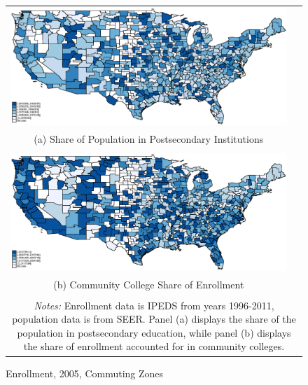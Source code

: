 \begin{figure}[h]\centering\caption{Enrollment, 2005, Commuting Zones}\begin{tabular}{cc}
\\
\includegraphics[scale=0.64]{./figures/sh_tef_2005}\\(a) Share of Population in Postsecondary Institutions\\\\
\includegraphics[scale=0.64]{./figures/sh2y_2005}\\
(b) Community College Share of Enrollment\\\\
\multicolumn{2}{p{6in}}{\footnotesize \emph{Notes:} Enrollment data is IPEDS from years 1996-2011, population data is from SEER. Panel (a) displays the share of the population in postsecondary education, while panel (b) displays the share of enrollment accounted for in community colleges.}
\end{tabular}
\label{fig:mapenr}
\end{figure}

